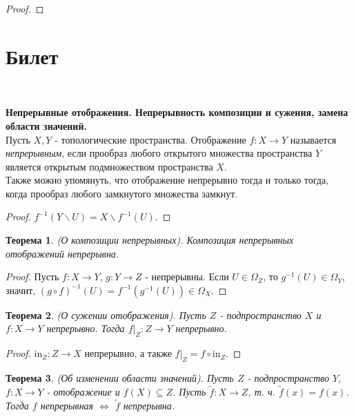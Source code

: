 \documentclass[a4paper,100pt]{article}
\theoremstyle{indented}
\newtheorem{theorem}{Теорема}
\begin{document}
\begin{itemize}
\begin{proof}
    \end{proof}
\end{itemize}

\section{Билет} \

\medskip

\textbf{Непрерывные отображения. Непрерывность композиции и сужения, замена области значений.}\\

Пусть $X, Y$ - топологические пространства. Отображение $f: X \rightarrow Y$ называется \textit{непрерывным}, если прообраз любого открытого множества пространства $Y$ является открытым подмножеством пространства $X$.\\

Также можно упомянуть, что отображение непрерывно тогда и только тогда, когда прообраз любого замкнутого множества замкнут. 

\begin{proof}
    $f^{-1}(Y\backslash U)=X\backslash f^{-1}(U)$.
\end{proof}

\begin{theorem}
    (О композиции непрерывных). Композиция непрерывных отображений непрерывна.
\end{theorem}

\begin{proof}
    Пусть $f:X\rightarrow Y$, $g:Y\rightarrow Z$ - непрерывны. Если $U\in \Omega_Z$, то $g^{-1}(U)\in \Omega_Y$, значит, $(g\circ f)^{-1}(U)=f^{-1}(g^{-1}(U))\in\Omega_X$.
\end{proof}

\begin{theorem}
    (О сужении отображения). Пусть $Z$ - подпространство $X$ и $f: X\rightarrow Y$ непрерывно. Тогда $f|_Z:Z\rightarrow Y$ непрерывно.
\end{theorem}

\begin{proof}
    $\text{in}_Z: Z\rightarrow X$ непрерывно, а также $f|_Z = f\circ \text{in}_Z$.
\end{proof}

\begin{theorem}
    (Об изменении области значений). Пусть $Z$ - подпространство $Y$, $f:X\rightarrow Y$ - отображение и $f(X)\subseteq Z$. Пусть $\tilde{f}: X\rightarrow Z$, т. ч. $\tilde{f}(x)=f(x)$. Тогда $f$ непрерывная $\Longleftrightarrow$ $\tilde{f}$ непрерывна.
\end{theorem}
\end{document}
